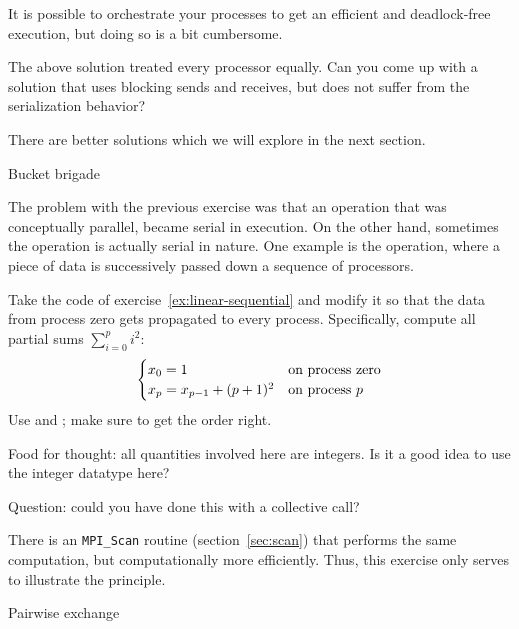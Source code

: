 It is possible to orchestrate your processes to get an efficient and
deadlock-free execution, but doing so is a bit cumbersome.

\begin{exercise}
  The above solution treated every processor equally. Can you come up
  with a solution that uses blocking sends and receives, but does not
  suffer from the serialization behavior?
\end{exercise}

There are better solutions which we will
explore in the next section.

 {Bucket brigade}
\label{sec:bucketbrigade}

The problem with the previous exercise was that an operation that was
conceptually parallel, became serial in execution. On the other hand,
sometimes the operation is actually serial in nature. One example is
the  operation, where a piece of data is
successively passed down a sequence of processors.

\begin{exercise}
  \label{ex:bucket-block}
  Take the code of exercise~\ref{ex:linear-sequential} and modify it
  so that the data from process zero gets propagated to every
  process. Specifically, compute all partial sums $\sum_{i=0}^pi^2$:
  \[ 
  \begin{cases}
    x_0 = 1&\hbox{on process zero}\\
    x_p = x_{p-1}+(p+1)^2 & \hbox{on process $p$}\\
  \end{cases}
  \]
  Use  and ; make sure to get the order right.

  Food for thought: all quantities involved here are integers. Is it a good idea to
  use the integer datatype here?

  Question: could you have done this with a collective call?
\end{exercise}

\begin{remark}
  There is an \lstinline{MPI_Scan} routine (section~\ref{sec:scan})
  that performs the same computation,
  but computationally more efficiently. Thus, this exercise only serves to illustrate
  the principle.
\end{remark}


 {Pairwise exchange}
\label{sec:send-recv}

